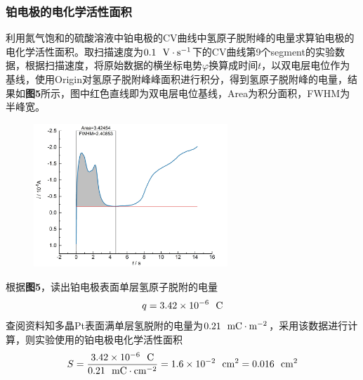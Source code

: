 \documentclass[12pt]{article}
\begin{document}
 \subsubsection{铂电极的电化学活性面积}
 利用氮气饱和的硫酸溶液中铂电极的CV曲线中氢原子脱附峰的电量求算铂电极的电化学活性面积。取扫描速度为$0.1\ \ {\rm V\cdot s^{-1}}$下的CV曲线第9个segment的实验数据，根据扫描速度，将原始数据的横坐标电势$\varphi$换算成时间$t$，以双电层电位作为基线，使用Origin对氢原子脱附峰峰面积进行积分，得到氢原子脱附峰的电量，结果如\textbf{图5}所示，图中红色直线即为双电层电位基线，Area为积分面积，FWHM为半峰宽。
 \begin{figure}[h]
 	\centering
 	\includegraphics[width=0.65\textwidth]{5.jpg}
 \end{figure}
 \par
 根据\textbf{图5}，读出铂电极表面单层氢原子脱附的电量
 $$
 q=3.42\times10^{-6}\ \ {\rm C}
 $$
 查阅资料\citealp{physchemlab}知多晶Pt表面满单层氢脱附的电量为$0.21\ \ {\rm mC\cdot m^{-2}}$，采用该数据进行计算，则实验使用的铂电极电化学活性面积
 $$
 S=\frac{3.42\times10^{-6}\ \ {\rm C}}{0.21\ \ {\rm mC\cdot cm^{-2}}}=1.6\times 10^{-2}\ \ {\rm cm^{2}}=0.016\ \ {\rm cm^{2}}
 $$
\end{document}
